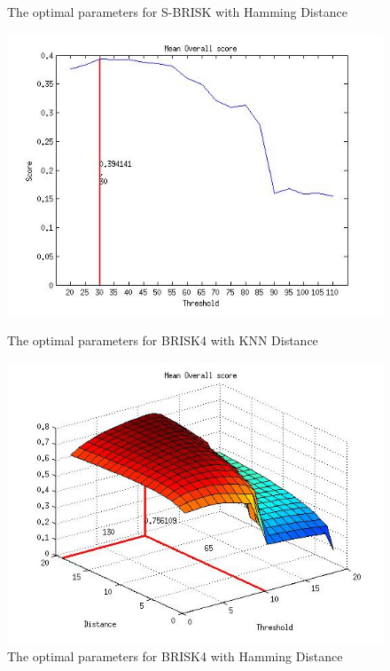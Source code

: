 \documentclass{article}
\begin{document}
\begin{figure}[h!]
\begin{minipage}[b]{0.5\linewidth}
\caption{The optimal parameters for S-BRISK with Hamming Distance}
\label{fig:sbriskhammingOptimal}
\end{minipage}
\begin{minipage}[b]{0.5\linewidth}
\includegraphics[scale=0.5]{../Drawings/OptimalParameters_BRISK4_BRISK4_KNN.jpg}
\caption{The optimal parameters for BRISK4 with KNN Distance}
\label{fig:brisk4knnOptimal}
\end{minipage}
\begin{minipage}[b]{0.5\linewidth}
\includegraphics[scale=0.5]{../Drawings/OptimalParameters_BRISK4_BRISK4_Hamming.jpg}
\caption{The optimal parameters for BRISK4 with Hamming Distance}
\label{fig:brisk4hammingOptimal}
\end{minipage}

\end{figure}
\end{document}
